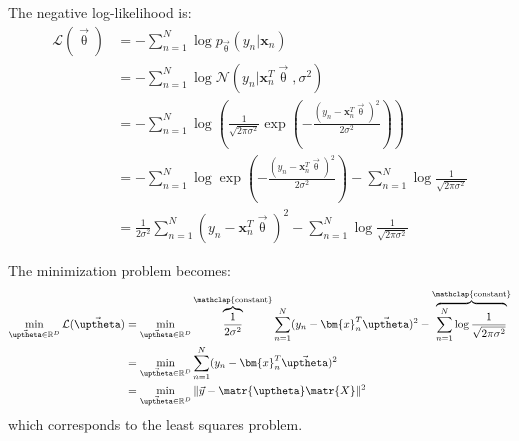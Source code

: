 \begin{description}
\begin{description}
                The negative log-likelihood is:
                \[
                    \begin{split}
                        \mathcal{L}(\vec{\uptheta}) &= -\sum_{n=1}^{N} \log p_\vec{\uptheta}(y_n \vert \bm{x}_n) \\
                            &= -\sum_{n=1}^{N} \log \mathcal{N}(y_n \vert \bm{x}_n^T\vec{\uptheta}, \sigma^2) \\
                            &= -\sum_{n=1}^{N} \log \left( \frac{1}{\sqrt{2\pi\sigma^2}} \exp\left(-\frac{(y_n-\bm{x}_n^T\vec{\uptheta})^2}{2\sigma^2}\right) \right) \\
                            &= -\sum_{n=1}^{N} \log\exp\left(-\frac{(y_n-\bm{x}_n^T\vec{\uptheta})^2}{2\sigma^2}\right) - \sum_{n=1}^{N} \log\frac{1}{\sqrt{2\pi\sigma^2}} \\
                            &= \frac{1}{2\sigma^2} \sum_{n=1}^{N} (y_n-\bm{x}_n^T\vec{\uptheta})^2 - \sum_{n=1}^{N} \log\frac{1}{\sqrt{2\pi\sigma^2}}
                    \end{split}  
                \]
        
                The minimization problem becomes:
                \[
                    \begin{split}
                        \min_{\vec{\uptheta} \in \mathbb{R}^D} \mathcal{L}(\vec{\uptheta}) &= 
                            \min_{\vec{\uptheta} \in \mathbb{R}^D} 
                                \overbrace{\frac{1}{2\sigma^2}}^{\mathclap{\text{constant}}} 
                                \sum_{n=1}^{N} (y_n-\bm{x}_n^T\vec{\uptheta})^2 - 
                                \overbrace{\sum_{n=1}^{N} \log\frac{1}{\sqrt{2\pi\sigma^2}}}^{\mathclap{\text{constant}}} \\
                            &= \min_{\vec{\uptheta} \in \mathbb{R}^D} \sum_{n=1}^{N} (y_n-\bm{x}_n^T\vec{\uptheta})^2 \\
                            &= \min_{\vec{\uptheta} \in \mathbb{R}^D} \Vert \vec{y} - \matr{\uptheta}\matr{X} \Vert^2
                    \end{split}    
                \]
                which corresponds to the least squares problem.
        \end{description}


\end{description}
